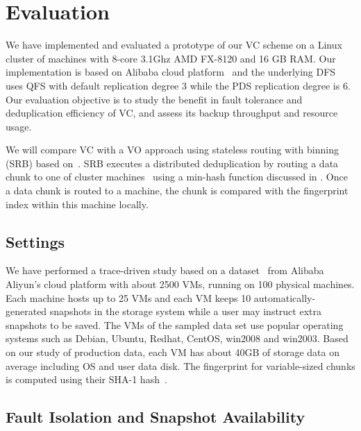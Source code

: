 \section{Evaluation}
\label{sect:evaluation}
We have implemented and evaluated a prototype of our VC scheme on a Linux cluster of machines with
8-core 3.1Ghz AMD FX-8120 and 16 GB RAM. 
Our implementation is based on Alibaba cloud platform~\cite{Aliyun,WeiZhangIEEE}
and the underlying DFS uses  QFS with default replication degree 3 while the PDS replication degree is 6.
Our evaluation objective is to
study the benefit in fault tolerance and   deduplication efficiency of VC,  
and assess its backup throughput and  resource usage. 

We will compare VC with a VO approach  using stateless routing with binning (SRB) 
based on~\cite{Dong2011,extreme_binning09}.
SRB executes a distributed deduplication by routing a data chunk to one of cluster machines~\cite{Dong2011}
using  a min-hash function discussed in \cite{extreme_binning09}. Once a data chunk is routed to
a machine, the chunk is compared with the fingerprint index within this machine locally. 

\subsection{Settings}
We have performed a trace-driven study based on a dataset~\cite{WeiZhangIEEE} from 
Alibaba Aliyun's cloud platform with about 2500 VMs, running on 100 physical machines. 
Each machine hosts up to 25 VMs and each VM keeps 10 automatically-generated snapshots in the storage system while
a user may instruct extra snapshots to be saved.
The VMs of the sampled data set use popular operating systems such as 
Debian, Ubuntu, Redhat, CentOS, win2008 and win2003. 
Based on our study of production  data,  each VM has about 40GB of storage  data  on average
including OS and user data disk.
The fingerprint for variable-sized chunks is computed using their SHA-1 hash~\cite{similar94,rabin81}. 

\subsection{Fault Isolation and Snapshot Availability}

